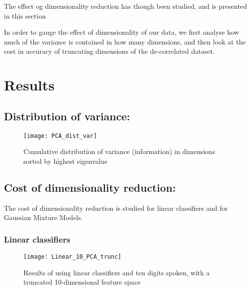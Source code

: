 The effect og dimensionality reduction has though been studied, and is presented in this section

In order to gauge the effect of dimensionality of our data, we first analyse how much of the variance is contained in how many dimensions, and then look at the cost in accuracy of truncating dimensions of the de-correlated dataset.


\section{Results}

\subsection{Distribution of variance:}

\begin{figure}[H]
\centering
\texttt{[image: PCA\_dist\_var]}
\caption{Cumulative distribution of variance (information) in dimensions sorted by highest eigenvalue}
\label{fig:PCA_dist}
\end{figure}

\subsection{Cost of dimensionality reduction:}
The cost of dimensionality reduction is studied for linear classifiers and for Gaussian Mixture Models.

\subsubsection{Linear classifiers}

\begin{figure}[H]
\centering
\texttt{[image: Linear\_10\_PCA\_trunc]}
\caption{Results of using linear classifiers and ten digits spoken, with a truncated 10-dimensional feature space}
\label{fig:PCA_lin_trunc}
\end{figure}

